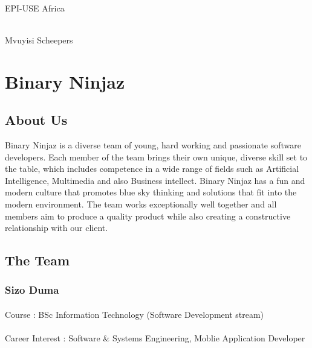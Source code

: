 \documentclass[11pt]{article}
\begin{document}
\begin{titlepage}
\begin{center}
		\begin{minipage}{0.5\textwidth}
			\begin{flushleft} \large
				\emph{} \\
				EPI-USE Africa
			\end{flushleft}
		\end{minipage}
		\begin{minipage}{0.4\textwidth}
			\begin{flushright} \large
				\emph{} \\
				Mvuyisi Scheepers
			\end{flushright}
			\newline
		\end{minipage}
	\end{center}
\end{titlepage}
\tableofcontents


\section{Binary Ninjaz}
\subsection{About Us}
Binary Ninjaz is a diverse team of young, hard working and passionate software developers. Each member of the team brings their own unique, diverse skill set to the table, which includes competence in a wide range of fields such as Artificial Intelligence, Multimedia and also Business intellect. Binary Ninjaz has a fun and modern culture that promotes blue sky thinking and solutions that fit into the modern environment. The team works exceptionally well together and all members aim to produce a quality product while also creating a constructive relationship with our client.


\subsection{The Team}




\subsubsection{Sizo Duma} 
\paragraph{}Course : BSc Information Technology (Software Development stream)
\paragraph{} Career Interest : Software & Systems Engineering, Moblie Application Developer 
\end{document}
